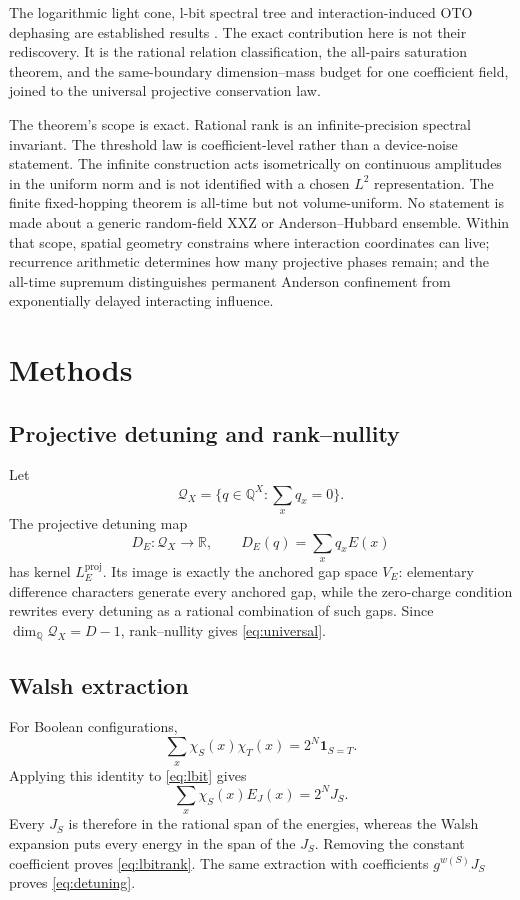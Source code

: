\documentclass[10pt]{article}
\theoremstyle{definition}
\newcommand{\Q}{\mathbb Q}
\newcommand{\R}{\mathbb R}
\begin{document}
The logarithmic light cone, l-bit spectral tree and interaction-induced OTO
dephasing are established results
\cite{KimChandranAbanin2014,NandkishoreGopalakrishnanHuse2014,
ChenZhouHuseFradkin2017}. The exact contribution here is not their
rediscovery. It is the rational relation classification, the all-pairs
saturation theorem, and the same-boundary dimension--mass budget for one
coefficient field, joined to the universal projective conservation law.

The theorem's scope is exact. Rational rank is an infinite-precision
spectral invariant. The threshold law is coefficient-level rather than a
device-noise statement. The infinite construction acts isometrically on
continuous amplitudes in the uniform norm and is not identified with a
chosen \(L^2\) representation. The finite fixed-hopping theorem is
all-time but not volume-uniform. No statement is made about a generic
random-field XXZ or Anderson--Hubbard ensemble. Within that scope, spatial
geometry constrains where interaction coordinates can live; recurrence
arithmetic determines how many projective phases remain; and the
all-time supremum distinguishes permanent Anderson confinement from
exponentially delayed interacting influence.

\section{Methods}

\subsection{Projective detuning and rank--nullity}

Let
\[
 \mathcal Q_X=\{q\in\Q^X:\sum_xq_x=0\}.
\]
The projective detuning map
\[
 D_E:\mathcal Q_X\to\R,\qquad
 D_E(q)=\sum_xq_xE(x)
\]
has kernel \(L_E^{\mathrm{proj}}\). Its image is exactly the anchored gap
space \(V_E\): elementary difference characters generate every anchored
gap, while the zero-charge condition rewrites every detuning as a rational
combination of such gaps. Since
\(\dim_{\Q}\mathcal Q_X=D-1\), rank--nullity gives
\eqref{eq:universal}.

\subsection{Walsh extraction}

For Boolean configurations,
\[
 \sum_x\chi_S(x)\chi_T(x)=2^N\mathbf 1_{S=T}.
\]
Applying this identity to \eqref{eq:lbit} gives
\[
 \sum_x\chi_S(x)E_J(x)=2^NJ_S.
\]
Every \(J_S\) is therefore in the rational span of the energies, whereas
the Walsh expansion puts every energy in the span of the \(J_S\). Removing
the constant coefficient proves \eqref{eq:lbitrank}. The same extraction
with coefficients \(g^{w(S)}J_S\) proves \eqref{eq:detuning}.
\end{document}
